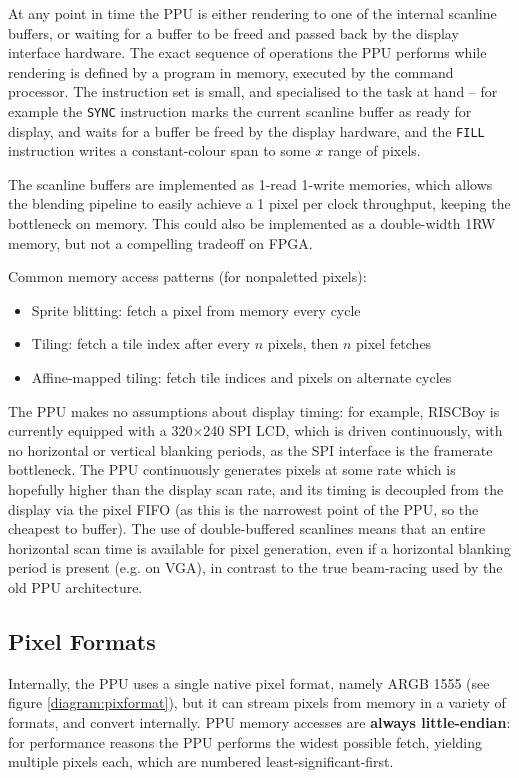 At any point in time the PPU is either rendering to one of the internal scanline buffers, or waiting for a buffer to be freed and passed back by the display interface hardware. The exact sequence of operations the PPU performs while rendering is defined by a program in memory, executed by the command processor. The instruction set is small, and specialised to the task at hand -- for example the {\tt SYNC} instruction marks the current scanline buffer as ready for display, and waits for a buffer be freed by the display hardware, and the {\tt FILL} instruction writes a constant-colour span to some $x$ range of pixels.

The scanline buffers are implemented as 1-read 1-write memories, which allows the blending pipeline to easily achieve a 1 pixel per clock throughput, keeping the bottleneck on memory. This could also be implemented as a double-width 1RW memory, but not a compelling tradeoff on FPGA.

Common memory access patterns (for nonpaletted pixels):

\begin{itemize}
	\item Sprite blitting: fetch a pixel from memory every cycle
	\item Tiling: fetch a tile index after every $n$ pixels, then $n$ pixel fetches
	\item Affine-mapped tiling: fetch tile indices and pixels on alternate cycles
\end{itemize}


The PPU makes no assumptions about display timing: for example, RISCBoy is currently equipped with a 320$\times$240 SPI LCD, which is driven continuously, with no horizontal or vertical blanking periods, as the SPI interface is the framerate bottleneck. The PPU continuously generates pixels at some rate which is hopefully higher than the display scan rate, and its timing is decoupled from the display via the pixel FIFO (as this is the narrowest point of the PPU, so the cheapest to buffer). The use of double-buffered scanlines means that an entire horizontal scan time is available for pixel generation, even if a horizontal blanking period is present (e.g. on VGA), in contrast to the true beam-racing used by the old PPU architecture.

\subsection{Pixel Formats}

Internally, the PPU uses a single native pixel format, namely ARGB 1555 (see figure \ref{diagram:pixformat}), but it can stream pixels from memory in a variety of formats, and convert internally. PPU memory accesses are \textbf{always little-endian}: for performance reasons the PPU performs the widest possible fetch, yielding multiple pixels each, which are numbered least-significant-first.

